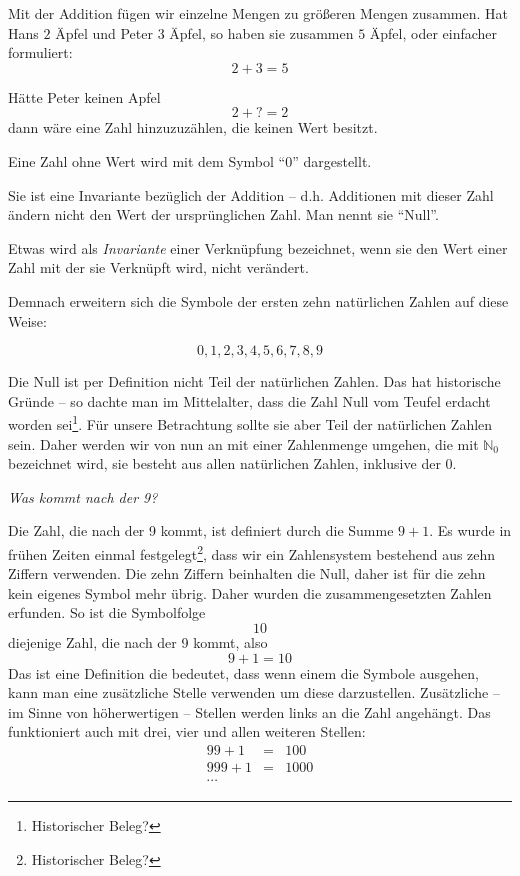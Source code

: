 Mit der Addition fügen wir einzelne Mengen zu größeren Mengen zusammen. Hat Hans $2$ Äpfel und Peter $3$ Äpfel, so haben sie zusammen $5$ Äpfel, oder einfacher formuliert:
\[
2+3=5
\]

\noindent Hätte Peter keinen Apfel
\[2+?=2\]
dann wäre eine Zahl hinzuzuzählen, die keinen Wert besitzt. 
\begin{definition}
Eine Zahl ohne Wert wird mit dem Symbol "`0"' dargestellt.
\end{definition}

Sie ist eine Invariante bezüglich der Addition -- d.h. Additionen mit dieser Zahl ändern nicht den Wert der ursprünglichen Zahl. Man nennt sie "`Null"'. 

\begin{definition}
Etwas wird als \textsl{Invariante} einer Verknüpfung bezeichnet, wenn sie den Wert einer Zahl mit der sie Verknüpft wird, nicht verändert.
\end{definition}

Demnach erweitern sich die Symbole der ersten zehn natürlichen Zahlen auf diese Weise:

\[0,1,2,3,4,5,6,7,8,9\]

Die Null ist per Definition nicht Teil der natürlichen Zahlen. Das hat historische Gründe -- so dachte man im Mittelalter, dass die Zahl Null vom Teufel erdacht worden sei\footnote{Historischer Beleg?}. Für unsere Betrachtung sollte sie aber Teil der natürlichen Zahlen sein. Daher werden wir von nun an mit einer Zahlenmenge umgehen, die mit $\mathbb{N}_0$ bezeichnet wird, sie besteht aus allen natürlichen Zahlen, inklusive der 0.

\textsl{Was kommt nach der 9?}

Die Zahl, die nach der 9 kommt, ist definiert durch die Summe $9+1$. Es wurde in frühen Zeiten einmal festgelegt\footnote{Historischer Beleg?}, dass wir ein Zahlensystem bestehend aus zehn Ziffern verwenden. Die zehn Ziffern beinhalten die Null, daher ist für die zehn kein eigenes Symbol mehr übrig. Daher wurden die zusammengesetzten Zahlen erfunden. So ist die Symbolfolge
\[10\]
diejenige Zahl, die nach der 9 kommt, also
\[9+1=10\]
Das ist eine Definition die bedeutet, dass wenn einem die Symbole ausgehen, kann man eine zusätzliche Stelle verwenden um diese darzustellen. Zusätzliche -- im Sinne von höherwertigen -- Stellen werden links an die Zahl angehängt. Das funktioniert auch mit drei, vier und allen weiteren Stellen:
\begin{eqnarray*}
99+1 &=& 100 \\
999+1 &=& 1000 \\
\cdots
\end{eqnarray*}

